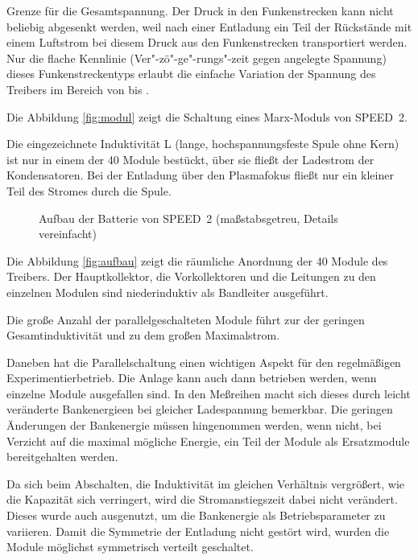 Grenze für die Gesamtspannung. Der Druck in den Funkenstrecken
kann nicht beliebig abgesenkt werden, weil nach einer Entladung
ein Teil der Rückstände mit einem Luftstrom bei diesem Druck aus
den Funkenstrecken transportiert werden. Nur die flache Kennlinie
(Ver"-zö"-ge"-rungs"-zeit gegen angelegte Spannung) dieses
Funkenstreckentyps erlaubt die einfache Variation der Spannung des
Treibers im Bereich von  bis .
\par
Die Abbildung \vref{fig:modul} zeigt die Schaltung eines
Marx-Moduls von SPEED~2.
\par
Die eingezeichnete Induktivität L (lange, hochspannungsfeste Spule
ohne Kern) ist nur in einem der 40 Module bestückt, über sie
fließt der Ladestrom der Kondensatoren. Bei der Entladung über den
Plasmafokus fließt nur ein kleiner Teil des Stromes durch die
Spule.
%
\par
\begin{figure}[H]
  \center
  \caption{Aufbau der Batterie von SPEED~2 (maßstabsgetreu, Details vereinfacht)}
  \label{fig:aufbau}
\end{figure}
%
\par
Die Abbildung \vref{fig:aufbau} zeigt die räumliche Anordnung der 40
Module des Treibers. Der Hauptkollektor, die Vorkollektoren und die
Leitungen zu den einzelnen Modulen sind niederinduktiv als Bandleiter
ausgeführt.
\par
Die große Anzahl der parallelgeschalteten Module führt zur der geringen
Gesamtinduktivität und zu dem großen Maximalstrom.
\par
Daneben hat die Parallelschaltung einen wichtigen Aspekt für den regelmäßigen
Experimentierbetrieb. Die Anlage kann auch dann betrieben werden, wenn einzelne
Module ausgefallen sind. In den Meßreihen macht sich dieses durch leicht
veränderte Bankenergieen bei gleicher Ladespannung bemerkbar. Die geringen
Änderungen der Bankenergie müssen hingenommen werden, wenn nicht, bei Verzicht
auf die maximal mögliche Energie, ein Teil der Module als Ersatzmodule
bereitgehalten werden.
\par
Da sich beim Abschalten, die Induktivität im gleichen Verhältnis
vergrößert, wie die Kapazität sich verringert, wird die
Stromanstiegszeit dabei nicht verändert. Dieses wurde auch
ausgenutzt, um die Bankenergie als Betriebsparameter zu variieren.
Damit die Symmetrie der Entladung nicht gestört wird, wurden die
Module möglichst symmetrisch verteilt geschaltet.
%
\label{sec:plasmafokus}
